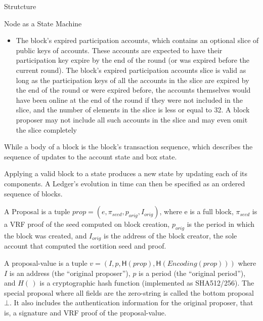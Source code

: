 \documentclass[10pt,a4paper]{article}
\begin{document}
\begin{section}{Strutcture}
\begin{subsection}{Node as a State Machine}
\begin{itemize}
    \item
    The block's expired participation accounts, which contains an optional slice
    of public keys of accounts. These accounts are expected to have their
    participation key expire by the end of the round (or was expired before
    the current round).
    The block's expired participation accounts slice is valid as long as the participation keys 
    of all the accounts in the slice are expired by the end of the round or
    were expired before, the accounts themselves would have been online at the end
    of the round if they were not included in the slice, and the number of elements
    in the slice is less or equal to 32. A block proposer may not include all such
    accounts in the slice and may even omit the slice completely
\end{itemize}
While a body of a block is the block's transaction sequence, which describes the sequence
of updates to the account state and box state.
%


Applying a valid block to a state produces a new state by updating each of its components.
A Ledger's evolution in time can then be specified as an ordered sequence of blocks.

A Proposal is a tuple $prop = (e, \pi_{seed}, p_{orig}, I_{orig})$, where
e is a full block, $\pi_{seed}$ is a VRF proof of the seed computed
on block creation, $p_{orig}$ is the period in which the block was created,
and $I_{orig}$ is the address of the block creator, the sole account that
computed the sortition seed and proof.

A proposal-value is a tuple $v = (I, p, \mathsf{H}(prop), \mathsf{H}(Encoding(prop)))$ where 
$I$ is an address (the ``original proposer''), 
$p$ is a period (the ``original period''), 
and
$H(\,)$ is a cryptographic hash function (implemented as SHA512/256). 
The special proposal where all fields are the zero-string is called the bottom 
proposal $\bot$. 
It also includes the authentication information for the original proposer, that is, 
a signature and VRF proof of the proposal-value.


\end{subsection}
\end{section}
\end{document}
